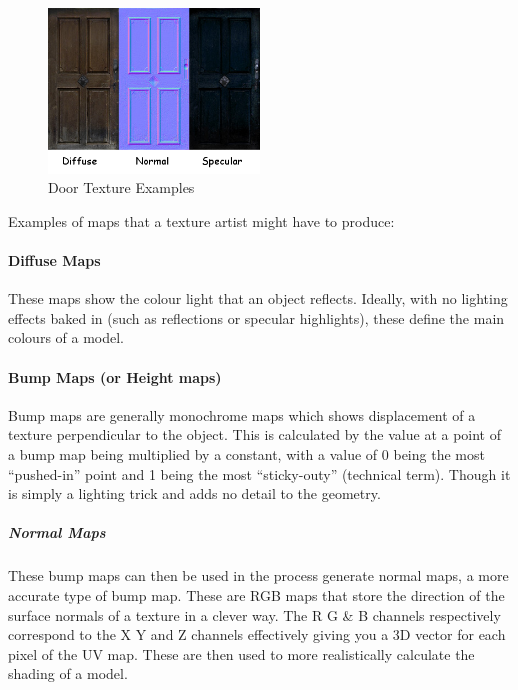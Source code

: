 \begin{figure}
\includegraphics[width=0.5\textwidth,height=\textheight]{./images/door_texture_examples.png}
\caption{Door Texture Examples}
\end{figure}

Examples of maps that a texture artist might have to produce:

\hypertarget{diffuse-maps}{%
\paragraph{Diffuse Maps}\label{diffuse-maps}}

These maps show the colour light that an object reflects. Ideally, with no lighting effects baked in (such as reflections or specular highlights), these define the main colours of a model.

\hypertarget{bump-maps-or-height-maps}{%
\paragraph{Bump Maps (or Height maps)}\label{bump-maps-or-height-maps}}

Bump maps are generally monochrome maps which shows displacement of a texture perpendicular to the object. This is calculated by the value at a point of a bump map being multiplied by a constant, with a value of 0 being the most ``pushed-in'' point and 1 being the most ``sticky-outy'' (technical term). Though it is simply a lighting trick and adds no detail to the geometry.

\hypertarget{normal-maps}{%
\subparagraph{Normal Maps}\label{normal-maps}}

These bump maps can then be used in the process generate normal maps, a more accurate type of bump map. These are RGB maps that store the direction of the surface normals of a texture in a clever way. The R G \& B channels respectively correspond to the X Y and Z channels effectively giving you a 3D vector for each pixel of the UV map. These are then used to more realistically calculate the shading of a model.

